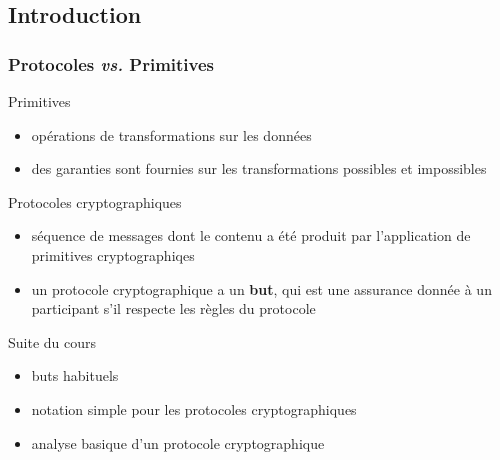 


  
\usepackage{ifthen}


\def\txthl#1{ \ifthenelse{\lengthtest{#1 pt<0.5pt}}{\top}{\bot} }



\begin{reveals}
		
\maketitle

\section{Introduction}

\begin{frame}
  \frametitle{Protocoles \textit{vs.} Primitives}

  \vfill

   \begin{block}{Primitives}
     \begin{itemize}
     \item opérations de transformations sur les données
     \item des garanties sont fournies sur les transformations
       possibles et impossibles
     \end{itemize}
  \end{block}

  \vfill

  \begin{block}{Protocoles cryptographiques}
    \begin{itemize}
    \item séquence de messages dont le contenu a été produit par
      l'application de primitives cryptographiqes
    \item un protocole cryptographique a un \textbf{but}, qui est une
      assurance donnée à un participant s'il respecte les règles du protocole
    \end{itemize}
  \end{block}

  \vfill

  \begin{block}{Suite du cours}
    \begin{itemize}
    \item buts habituels
    \item notation simple pour les protocoles cryptographiques
    \item analyse basique d'un protocole cryptographique
    \end{itemize}
  \end{block}


\end{frame}
\end{reveals}
